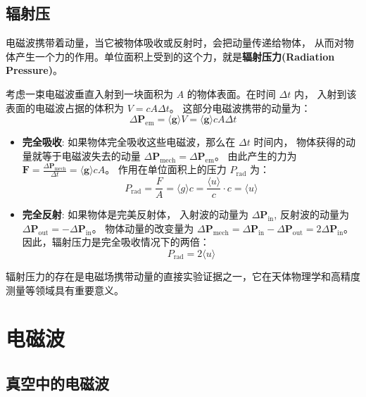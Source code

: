 \documentclass[fontset=none]{ctexart}
\begin{document}
\subsection{辐射压}
电磁波携带着动量，当它被物体吸收或反射时，会把动量传递给物体，
从而对物体产生一个力的作用。单位面积上受到的这个力，就是\textbf{辐射压力(Radiation Pressure)}。

考虑一束电磁波垂直入射到一块面积为 $A$ 的物体表面。在时间 $\Delta t$ 内，
入射到该表面的电磁波占据的体积为 $V = c A \Delta t$。
这部分电磁波携带的动量为：
\begin{equation}
    \Delta \bm{P}_{\text{em}} = \langle \bm{g} \rangle V = \langle \bm{g} \rangle c A \Delta t
\end{equation}
\begin{itemize}
    \item \textbf{完全吸收}: 如果物体完全吸收这些电磁波，那么在 $\Delta t$ 时间内，
    物体获得的动量就等于电磁波失去的动量 $\Delta \bm{P}_{\text{mech}} = \Delta \bm{P}_{\text{em}}$。
    由此产生的力为 $\bm{F} = \frac{\Delta \bm{P}_{\text{mech}}}{\Delta t} = \langle \bm{g} \rangle c A$。
    作用在单位面积上的压力 $P_{\text{rad}}$ 为：
    \begin{equation}
        P_{\text{rad}} = \frac{F}{A} = \langle g \rangle c 
        = \frac{\langle u \rangle}{c} \cdot c = \langle u \rangle
    \end{equation}
    \item \textbf{完全反射}: 如果物体是完美反射体，
    入射波的动量为 $\Delta \bm{P}_{\text{in}}$, 反射波的动量为 $\Delta \bm{P}_{\text{out}} 
    = -\Delta \bm{P}_{\text{in}}$。
    物体动量的改变量为 $\Delta \bm{P}_{\text{mech}} 
    = \Delta \bm{P}_{\text{in}} - \Delta \bm{P}_{\text{out}} = 2 \Delta \bm{P}_{\text{in}}$。
    因此，辐射压力是完全吸收情况下的两倍：
    \begin{equation}
        P_{\text{rad}} = 2 \langle u \rangle
    \end{equation}
\end{itemize}
辐射压力的存在是电磁场携带动量的直接实验证据之一，它在天体物理学和高精度测量等领域具有重要意义。

\section{电磁波}

\subsection{真空中的电磁波}
\end{document}
